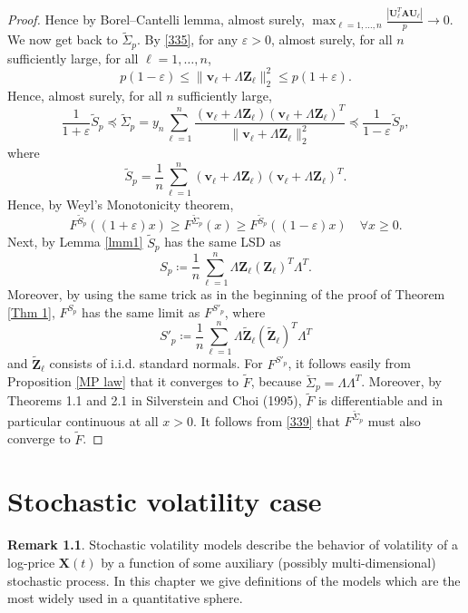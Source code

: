 \documentclass[a4paper,11pt]{book}
\theoremstyle{plain}
\theoremstyle{definition}
\newtheorem{rmrk}[thm]{Remark}
\begin{document}
\begin{proof}
    	 Hence by Borel–Cantelli lemma, almost surely, $\max_{\ell = 1, \dots, n} \frac{| \mathbf{U}_\ell^T \mathbf{A} \mathbf{U}_\ell |}{p} \rightarrow 0$.
    	 We now get back to $\widetilde{\Sigma}_p$. By \eqref{335}, for any $\varepsilon > 0$, almost surely, for all $n$ sufficiently large, for all $\ell = 1, \dots, n$,
    	 \[ p(1-\varepsilon) \leq \| \mathbf{v}_\ell + \Lambda \mathbf{Z}_\ell \|_2^2 \leq p(1+\varepsilon). \]
    	 Hence, almost surely, for all $n$ sufficiently large,
    	 \[ \frac{1}{1+\varepsilon} \widetilde{S}_p \preceq \widetilde{\Sigma}_p = y_n \sum_{\ell=1}^{n} \frac{(\mathbf{v}_\ell + \Lambda \mathbf{Z}_\ell) (\mathbf{v}_\ell + \Lambda \mathbf{Z}_\ell)^T}{\|\mathbf{v}_\ell + \Lambda \mathbf{Z}_\ell\|_2^2} \preceq \frac{1}{1-\varepsilon} \widetilde{S}_p, \]
    	 where
    	 \[  \widetilde{S}_p = \frac{1}{n}\sum_{\ell=1}^{n} (\mathbf{v}_\ell + \Lambda \mathbf{Z}_\ell) (\mathbf{v}_\ell + \Lambda \mathbf{Z}_\ell)^T. \]
    	 Hence, by Weyl's Monotonicity theorem,
    	 \begin{equation} \label{339}
    	     F^{\widetilde{S}_p}((1+\varepsilon)x) \geq F^{\widetilde{\Sigma}_p}(x) \geq F^{\widetilde{S}_p}((1-\varepsilon)x) \quad \forall x \geq 0.
    	 \end{equation}
    	 Next, by Lemma \ref{lmm1} $\widetilde{S}_p$ has the same LSD as 
    	 \[S_p \coloneqq \frac{1}{n} \sum_{\ell=1}^{n} \Lambda \mathbf{Z}_\ell (\mathbf{Z}_\ell)^T \Lambda^T.\]
    	 Moreover, by using the same trick as in the beginning of the proof of Theorem \ref{Thm 1}, $F^{S_p}$ has the same limit as $F^{S'_p}$, where
    	 \[S'_p \coloneqq \frac{1}{n} \sum_{\ell=1}^{n} \Lambda \widetilde{\mathbf{Z}}_\ell (\widetilde{\mathbf{Z}}_\ell)^T \Lambda^T\]
    	 and $\widetilde{\mathbf{Z}}_\ell$ consists of i.i.d. standard normals. For $F^{S'_p}$, it follows easily from Proposition \ref{MP law} that it converges to $\widetilde{F}$, because $\breve{\Sigma}_p = \Lambda \Lambda^T$. Moreover, by Theorems 1.1 and 2.1 in Silverstein and Choi (1995), $\widetilde{F}$ is differentiable and in particular continuous at all $x > 0$. It follows from \eqref{339} that $F^{\widetilde{\Sigma}_p}$ must also converge to $\widetilde{F}$.
    \end{proof}
    
    
    \chapter{Stochastic volatility case}
    \begin{rmrk}
    	Stochastic volatility models describe the behavior of volatility of a log-price $\mathbf{X}(t)$ by a function of some auxiliary (possibly multi-dimensional) stochastic process. In this chapter we give definitions of the models which are the most widely used in a quantitative sphere.
    \end{rmrk}
    
\end{document}
